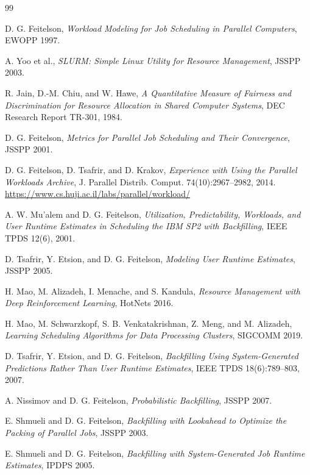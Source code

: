 \documentclass[11pt,twocolumn]{article}
\begin{document}
\begin{thebibliography}{99}

 D. G. Feitelson, \emph{Workload Modeling for Job Scheduling in Parallel Computers}, EWOPP 1997.

 A. Yoo et al., \emph{SLURM: Simple Linux Utility for Resource Management}, JSSPP 2003.

 R. Jain, D.-M. Chiu, and W. Hawe, \emph{A Quantitative Measure of Fairness and Discrimination for Resource Allocation in Shared Computer Systems}, DEC Research Report TR-301, 1984.

 D. G. Feitelson, \emph{Metrics for Parallel Job Scheduling and Their Convergence}, JSSPP 2001.

 D. G. Feitelson, D. Tsafrir, and D. Krakov, \emph{Experience with Using the Parallel Workloads Archive}, J. Parallel Distrib. Comput. 74(10):2967--2982, 2014. \url{https://www.cs.huji.ac.il/labs/parallel/workload/}

 A. W. Mu'alem and D. G. Feitelson, \emph{Utilization, Predictability, Workloads, and User Runtime Estimates in Scheduling the IBM SP2 with Backfilling}, IEEE TPDS 12(6), 2001.

 D. Tsafrir, Y. Etsion, and D. G. Feitelson, \emph{Modeling User Runtime Estimates}, JSSPP 2005.

 H. Mao, M. Alizadeh, I. Menache, and S. Kandula, \emph{Resource Management with Deep Reinforcement Learning}, HotNets 2016.

 H. Mao, M. Schwarzkopf, S. B. Venkatakrishnan, Z. Meng, and M. Alizadeh, \emph{Learning Scheduling Algorithms for Data Processing Clusters}, SIGCOMM 2019.


 D. Tsafrir, Y. Etsion, and D. G. Feitelson, \emph{Backfilling Using System-Generated Predictions Rather Than User Runtime Estimates}, IEEE TPDS 18(6):789--803, 2007.

 A. Nissimov and D. G. Feitelson, \emph{Probabilistic Backfilling}, JSSPP 2007.

 E. Shmueli and D. G. Feitelson, \emph{Backfilling with Lookahead to Optimize the Packing of Parallel Jobs}, JSSPP 2003.

 E. Shmueli and D. G. Feitelson, \emph{Backfilling with System-Generated Job Runtime Estimates}, IPDPS 2005.


\end{thebibliography}
\end{document}
